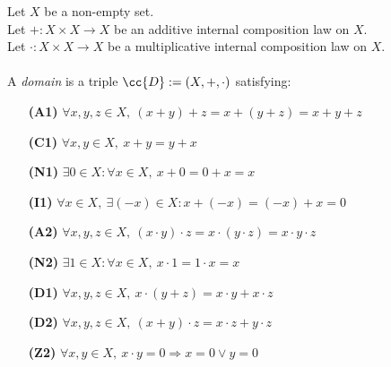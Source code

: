 \begin{definition-pre}[Domain]
    \label{def:domain}
    Let \(X\) be a non-empty set. \\
    Let \(+: X\times X \to X\) be an additive internal composition law on \(X\). \\
    Let \(\cdot: X\times X \to X\) be a multiplicative internal composition law on \(X\). \\\\
    A \textit{domain} is a triple \(\cc{D}:= (X, +, \cdot)\) satisfying:
    \begin{enumerate}
        \item [\textbf{(A1)}] \(\forall x,y,z\in X,\ (x+y)+z= x+(y+z) = x+y+z\)
        \item [\textbf{(C1)}] \(\forall x,y\in X,\ x+y = y+x\)
        \item [\textbf{(N1)}] \(\exists 0 \in X : \forall x \in X,\ x+0 = 0+x = x\)
        \item [\textbf{(I1)}] \(\forall x \in X,\ \exists (-x)\in X: x+(-x) = (-x)+x = 0\)
        \item [\textbf{(A2)}] \(\forall x,y,z\in X,\ (x\cdot y)\cdot z= x\cdot(y\cdot z) = x\cdot y\cdot z\)
        \item [\textbf{(N2)}] \(\exists 1 \in X : \forall x \in X,\ x\cdot1 = 1\cdot x = x\)
        \item [\textbf{(D1)}] \(\forall x,y,z \in X,\ x\cdot(y+z)=x\cdot y+x\cdot z\)
        \item [\textbf{(D2)}] \(\forall x,y,z \in X,\ (x+y)\cdot z=x\cdot z+y\cdot z\)
        \item [\textbf{(Z2)}] \(\forall x,y \in X,\ x\cdot y = 0 \Rightarrow x=0 \lor y=0\)
    \end{enumerate}
\end{definition-pre}

